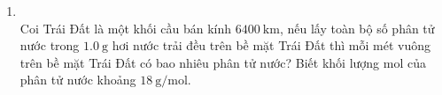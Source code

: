 \begin{enumerate}[label=\bfseries Câu \arabic*:, leftmargin=1.7cm]
\item {}\\
Coi Trái Đất là một khối cầu bán kính $\SI{6400}{\kilo\meter}$, nếu lấy toàn bộ số phân tử nước trong $\SI{1.0}{\gram}$ hơi nước trải đều trên bề mặt Trái Đất thì mỗi mét vuông trên bề mặt Trái Đất có bao nhiêu phân tử nước? Biết khối lượng mol của phân tử nước khoảng $\SI{18}{\gram/\mole}$.
\end{enumerate}
